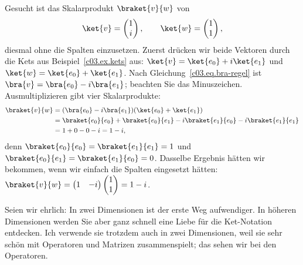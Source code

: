 \begin{example}\label{c03.ex.dirac}
  Gesucht ist das Skalarprodukt $\braket{v}{w}$ von
  \begin{equation}\label{c03.eq.dirac-vw}
    \ket{v} = \begin{pmatrix} 1 \\ i \end{pmatrix},
    \qquad
    \ket{w} = \begin{pmatrix} 1 \\ 1 \end{pmatrix},
  \end{equation}
  diesmal ohne die Spalten einzusetzen. Zuerst drücken wir beide Vektoren durch die Kets aus
  Beispiel~\ref{c03.ex.kets} aus: $\ket{v} = \ket{e_0} + i \ket{e_1}$ und
  $\ket{w} = \ket{e_0} + \ket{e_1}$. Nach Gleichung~\eqref{c03.eq.bra-regel} ist
  $\bra{v} = \bra{e_0} - i \bra{e_1}$; beachten Sie das Minuszeichen. Ausmultiplizieren gibt
  vier Skalarprodukte:
  \begin{equation}\label{c03.eq.dirac}
    \begin{aligned}
      \braket{v}{w} &= (\bra{e_0} - i \bra{e_1}) (\ket{e_0} + \ket{e_1}) \\
      &= \braket{e_0}{e_0} + \braket{e_0}{e_1} - i \braket{e_1}{e_0} - i \braket{e_1}{e_1} \\
      &= 1 + 0 - 0 - i = 1 - i ,
    \end{aligned}
  \end{equation}
  denn $\braket{e_0}{e_0} = \braket{e_1}{e_1} = 1$ und $\braket{e_0}{e_1} = \braket{e_1}{e_0} = 0$.
  Dasselbe Ergebnis hätten wir bekommen, wenn wir einfach die Spalten eingesetzt hätten:
  $\braket{v}{w} = \begin{pmatrix} 1 & -i \end{pmatrix} \begin{pmatrix} 1 \\ 1 \end{pmatrix} = 1 - i$.
\end{example}

Seien wir ehrlich: In zwei Dimensionen ist der erste Weg aufwendiger. In höheren Dimensionen
werden Sie aber ganz schnell eine Liebe für die Ket-Notation entdecken. Ich verwende sie
trotzdem auch in zwei Dimensionen, weil sie sehr schön mit Operatoren und Matrizen
zusammenspielt; das sehen wir bei den Operatoren.

